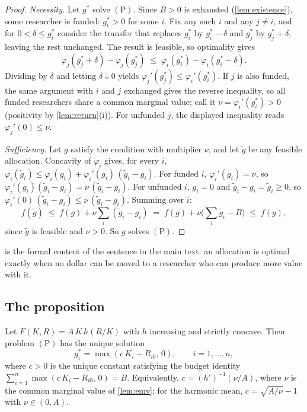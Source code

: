 \begin{proof}
\emph{Necessity.} Let $g^*$ solve $(\mathrm{P})$. Since $B > 0$ is exhausted (\cref{lem:existence}), some researcher is funded: $g_i^* > 0$ for some $i$. Fix any such $i$ and any $j \neq i$, and for $0 < \delta \leq g_i^*$ consider the transfer that replaces $g_i^*$ by $g_i^* - \delta$ and $g_j^*$ by $g_j^* + \delta$, leaving the rest unchanged. The result is feasible, so optimality gives
\[
\varphi_j(g_j^* + \delta) - \varphi_j(g_j^*) \;\leq\; \varphi_i(g_i^*) - \varphi_i(g_i^* - \delta).
\]
Dividing by $\delta$ and letting $\delta \downarrow 0$ yields $\varphi_j'(g_j^*) \leq \varphi_i'(g_i^*)$. If $j$ is also funded, the same argument with $i$ and $j$ exchanged gives the reverse inequality, so all funded researchers share a common marginal value; call it $\nu = \varphi_i'(g_i^*) > 0$ (positivity by \cref{lem:return}(i)). For unfunded $j$, the displayed inequality reads $\varphi_j'(0) \leq \nu$.

\emph{Sufficiency.} Let $g$ satisfy the condition with multiplier $\nu$, and let $\tilde g$ be any feasible allocation. Concavity of $\varphi_i$ gives, for every $i$, $\varphi_i(\tilde g_i) \leq \varphi_i(g_i) + \varphi_i'(g_i)\,(\tilde g_i - g_i)$. For funded $i$, $\varphi_i'(g_i) = \nu$, so $\varphi_i'(g_i)(\tilde g_i - g_i) = \nu\,(\tilde g_i - g_i)$. For unfunded $i$, $g_i = 0$ and $\tilde g_i - g_i = \tilde g_i \geq 0$, so $\varphi_i'(0)\,(\tilde g_i - g_i) \leq \nu\,(\tilde g_i - g_i)$. Summing over $i$:
\[
f(\tilde g) \;\leq\; f(g) + \nu \sum_i (\tilde g_i - g_i) \;=\; f(g) + \nu\Big(\sum_i \tilde g_i - B\Big) \;\leq\; f(g),
\]
since $\tilde g$ is feasible and $\nu > 0$. So $g$ solves $(\mathrm{P})$.
\end{proof}

 is the formal content of the sentence in the main text: an allocation is optimal exactly when no dollar can be moved to a researcher who can produce more value with it.

\subsection*{The proposition}

\begin{proprestate}
Let $F(K, R) = A\,K\,h(R/K)$ with $h$ increasing and strictly concave. Then problem $(\mathrm{P})$ has the unique solution
\[
g_i^* = \max(c\,K_i - R_{i0},\, 0), \qquad i = 1, \ldots, n,
\]
where $c > 0$ is the unique constant satisfying the budget identity $\sum_{i=1}^n \max(c\,K_i - R_{i0},\, 0) = B$. Equivalently, $c = (h')^{-1}(\nu/A)$, where $\nu$ is the common marginal value of \cref{lem:emv}; for the harmonic mean, $c = \sqrt{A/\nu} - 1$ with $\nu \in (0, A)$.
\end{proprestate}

